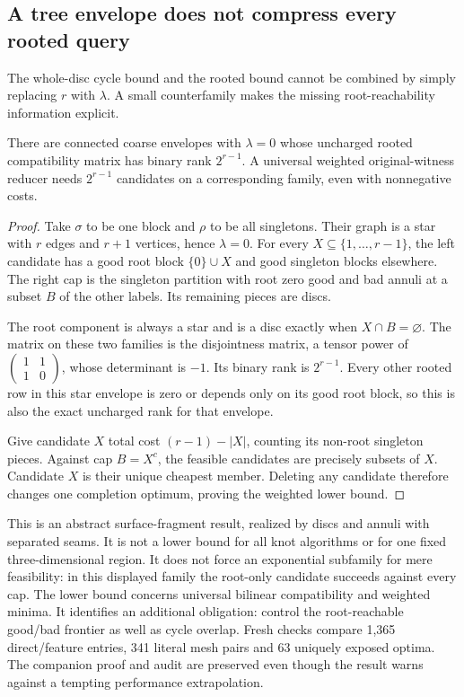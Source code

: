 \subsection{A tree envelope does not compress every rooted query}

The whole-disc cycle bound and the rooted bound cannot be combined by simply
replacing $r$ with $\lambda$. A small counterfamily makes the missing
root-reachability information explicit.

\begin{proposition}
There are connected coarse envelopes with $\lambda=0$ whose uncharged rooted
compatibility matrix has binary rank $2^{r-1}$. A universal weighted
original-witness reducer needs $2^{r-1}$ candidates on a corresponding family,
even with nonnegative costs.
\end{proposition}
\begin{proof}
Take $\sigma$ to be one block and $\rho$ to be all singletons. Their graph
is a star with $r$ edges and $r+1$ vertices, hence $\lambda=0$. For every
$X\subseteq\{1,\ldots,r-1\}$, the left candidate has a good root block
$\{0\}\cup X$ and good singleton blocks elsewhere. The right cap is the
singleton partition with root zero good and bad annuli at a subset $B$ of
the other labels. Its remaining pieces are discs.

The root component is always a star and is a disc exactly when
$X\cap B=\varnothing$. The matrix on these two families is the disjointness
matrix, a tensor power of
$\left(\begin{smallmatrix}1&1\\1&0\end{smallmatrix}\right)$, whose determinant
is $-1$. Its binary rank is $2^{r-1}$. Every other rooted row in this star
envelope is zero or depends only on its good root block, so this is also
the exact uncharged rank for that envelope.

Give candidate $X$ total cost $(r-1)-|X|$, counting its non-root singleton
pieces. Against cap $B=X^c$, the feasible candidates are precisely subsets
of $X$. Candidate $X$ is their unique cheapest member. Deleting any candidate
therefore changes one completion optimum, proving the weighted lower bound.
\end{proof}

This is an abstract surface-fragment result, realized by discs and annuli
with separated seams. It is not a lower bound for all knot algorithms or for
one fixed three-dimensional region. It does not force an exponential
subfamily for mere feasibility: in this displayed family the root-only
candidate succeeds against every cap. The lower bound concerns universal
bilinear compatibility and weighted minima. It identifies an additional obligation:
control the root-reachable good/bad frontier as well as cycle overlap. Fresh
checks compare 1,365 direct/feature entries, 341 literal mesh pairs and 63
uniquely exposed optima. The companion proof and audit are preserved even
though the result warns against a tempting performance extrapolation.

